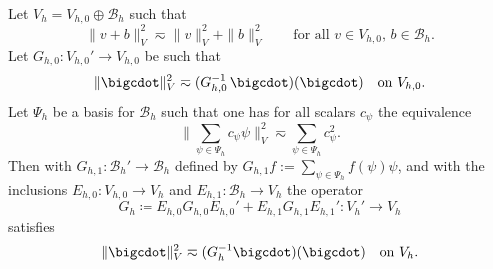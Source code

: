 \documentclass{amsart}
\newcommand{\be}{\begin{equation}}
\newcommand{\ee}{\end{equation}}
\begin{document}
\begin{proposition}[Splitting]\label{prop:splitting} Let $V_h=V_{h,0} \oplus \mathcal{B}_h$ such that
\be \label{eq:7}
\|v+b\|_V^2 \eqsim \|v\|_V^2+ \|b\|_V^2 \qquad\text{for all }v \in V_{h,0},\,b \in \mathcal{B}_h.
\ee
Let $G_{h,0}\colon V_{h,0} ' \rightarrow V_{h,0}$ be such that
\be \label{eq:8}
\|\bigcdot\|_V^2 \eqsim (G_{h,0}^{-1}\,\bigcdot)(\bigcdot) \quad \text{on } V_{h,0}.
\ee
Let $\Psi_h$ be a basis for $\mathcal{B}_h$ such that one has for all scalars $c_\psi$ the equivalence
\be \label{eq:9}
\Big\|\sum_{\psi \in \Psi_h} c_\psi \psi\Big\|_V^2 \eqsim \sum_{\psi \in \Psi_h} c_\psi^2.
\ee
%
Then with $G_{h,1}\colon \mathcal{B}_h'\rightarrow \mathcal{B}_h$ defined by $G_{h,1}f :=\sum_{\psi \in \Psi_h} f(\psi)\psi$, and 
with the inclusions $E_{h,0}\colon V_{h,0} \rightarrow V_h$ and $E_{h,1}\colon \mathcal{B}_h \rightarrow V_h$ the operator
\begin{equation}\label{eq:SplittedPrecond}
G_h\coloneqq E_{h,0} G_{h,0} E_{h,0}'+ E_{h,1} G_{h,1} E_{h,1}'\colon V_h' \rightarrow V_h
\end{equation}
satisfies 
\begin{equation*}
\|\bigcdot\|_V^2 \eqsim (G_h^{-1}\bigcdot)(\bigcdot) \quad \text{on } V_h.
\end{equation*}
\end{proposition}
\end{document}
